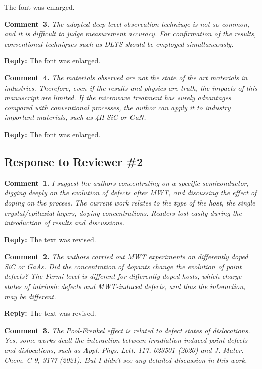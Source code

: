 \documentclass[10pt]{iopart}
\begin{document}
The font was enlarged.

\vspace{1cm}
\noindent
\textcolor[rgb]{0.00,0.50,1.00}{\textbf{Comment~3.}}
\emph{The adopted deep level observation techniuqe is not so common,
and it is difficult to judge measurement accuracy.
For confirmation of the results, conventional techniques such as DLTS should be employed simultaneously.}

\noindent
\textcolor[rgb]{0.51,0.00,0.00}{\textbf{Reply:}}
The font was enlarged.


\vspace{1cm}
\noindent
\textcolor[rgb]{0.00,0.50,1.00}{\textbf{Comment~4.}}
\emph{The materials observed are not the state of the art materials in industries.
Therefore, even if the results and physics are truth,
the impacts of this manuscript are limited.
If the microwave treatment has surely advantages compared
with conventional processes, the author can apply it to industry important materials, such as 4H-SiC or GaN.}


\noindent
\textcolor[rgb]{0.51,0.00,0.00}{\textbf{Reply:}}
The font was enlarged.


\subsection*{Response to Reviewer \#2 }
\noindent
\textcolor[rgb]{0.00,0.50,1.00}{\textbf{Comment~1.}}
\emph{I suggest the authors concentrating on a specific semiconductor,
digging deeply on the evolution of defects after MWT,
and discussing the effect of doping on the process.
The current work relates to the type of the host,
the single crystal/epitaxial layers, doping concentrations.
Readers lost easily during the introduction of results and discussions.}

\noindent
\textcolor[rgb]{0.51,0.00,0.00}{\textbf{Reply:}}
The text was revised.


\vspace{1cm}
\noindent
\textcolor[rgb]{0.00,0.50,1.00}{\textbf{Comment~2.}}
\emph{The authors carried out MWT experiments on differently doped SiC or GaAs.
Did the concentration of dopants change the evolution of point defects?
The Fermi level is different for differently doped hosts,
which charge states of intrinsic defects and MWT-induced defects, and thus the interaction, may be different.}

\noindent
\textcolor[rgb]{0.51,0.00,0.00}{\textbf{Reply:}}
The text was revised.


\vspace{1cm}
\noindent
\textcolor[rgb]{0.00,0.50,1.00}{\textbf{Comment~3.}}
\emph{The Pool-Frenkel effect is related to defect states of dislocations.
Yes, some works dealt the interaction between irradiation-induced point defects and dislocations,
such as Appl. Phys. Lett. 117, 023501 (2020) and J. Mater. Chem. C 9, 3177 (2021).
But I didn’t see any detailed discussion in this work.}
\end{document}
